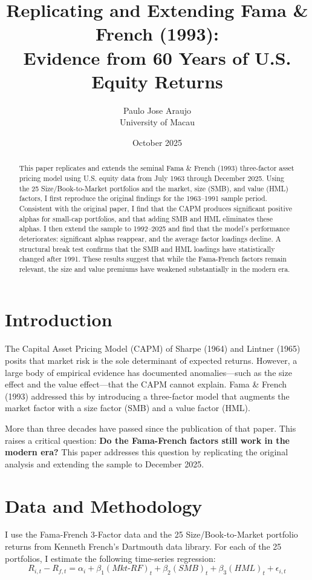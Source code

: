 \documentclass[11pt]{article}
\title{\textbf{Replicating and Extending Fama \& French (1993):\\Evidence from 60 Years of U.S. Equity Returns}}
\author{Paulo Jose Araujo \\ University of Macau}
\date{October 2025}
\begin{document}
\maketitle

\begin{abstract}
\noindent This paper replicates and extends the seminal Fama \& French (1993) three-factor asset pricing model using U.S. equity data from July 1963 through December 2025. Using the 25 Size/Book-to-Market portfolios and the market, size (SMB), and value (HML) factors, I first reproduce the original findings for the 1963--1991 sample period. Consistent with the original paper, I find that the CAPM produces significant positive alphas for small-cap portfolios, and that adding SMB and HML eliminates these alphas. I then extend the sample to 1992--2025 and find that the model's performance deteriorates: significant alphas reappear, and the average factor loadings decline. A structural break test confirms that the SMB and HML loadings have statistically changed after 1991. These results suggest that while the Fama-French factors remain relevant, the size and value premiums have weakened substantially in the modern era.
\end{abstract}

\section{Introduction}
The Capital Asset Pricing Model (CAPM) of Sharpe (1964) and Lintner (1965) posits that market risk is the sole determinant of expected returns. However, a large body of empirical evidence has documented anomalies---such as the size effect and the value effect---that the CAPM cannot explain. Fama \& French (1993) addressed this by introducing a three-factor model that augments the market factor with a size factor (SMB) and a value factor (HML).

More than three decades have passed since the publication of that paper. This raises a critical question: \textbf{Do the Fama-French factors still work in the modern era?} This paper addresses this question by replicating the original analysis and extending the sample to December 2025.

\section{Data and Methodology}
I use the Fama-French 3-Factor data and the 25 Size/Book-to-Market portfolio returns from Kenneth French's Dartmouth data library. For each of the 25 portfolios, I estimate the following time-series regression:
\begin{equation}
R_{i,t} - R_{f,t} = \alpha_i + \beta_1(Mkt\text{-}RF)_t + \beta_2(SMB)_t + \beta_3(HML)_t + \epsilon_{i,t}
\end{equation}
\end{document}
